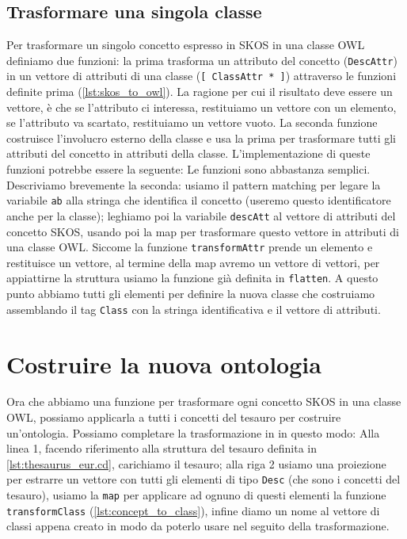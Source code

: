 \subsection{Trasformare una singola classe}
Per trasformare un singolo concetto espresso in SKOS in una classe OWL definiamo due funzioni: la prima trasforma un attributo del concetto (\verb|DescAttr|) in un vettore di attributi di una classe (\verb|[ ClassAttr * ]|) attraverso le funzioni definite prima (\ref{lst:skos_to_owl}). La ragione per cui il risultato deve essere un vettore, è che se l'attributo ci interessa, restituiamo un vettore con un elemento, se l'attributo va scartato, restituiamo un vettore vuoto. La seconda funzione costruisce l'involucro esterno della classe e usa la prima per trasformare tutti gli attributi del concetto in attributi della classe. L'implementazione di queste funzioni potrebbe essere la seguente:
Le funzioni sono abbastanza semplici. Descriviamo brevemente la seconda: usiamo il pattern matching per legare la variabile \verb|ab| alla stringa che identifica il concetto (useremo questo identificatore anche per la classe); leghiamo poi la variabile \verb|descAtt| al vettore di attributi del concetto SKOS, usando poi la map per trasformare questo vettore in attributi di una classe OWL. Siccome la funzione \verb|transformAttr| prende un elemento e restituisce un vettore, al termine della map avremo un vettore di vettori, per appiattirne la struttura usiamo la funzione già definita in \cduce \verb|flatten|. A questo punto abbiamo tutti gli elementi per definire la nuova classe che costruiamo assemblando il tag \verb|Class| con la stringa identificativa e il vettore di attributi.
\section{Costruire la nuova ontologia}
Ora che abbiamo una funzione per trasformare ogni concetto SKOS in una classe OWL, possiamo applicarla a tutti i concetti del tesauro per costruire un'ontologia. Possiamo completare la trasformazione in \cduce in questo modo:
Alla linea 1, facendo riferimento alla struttura del tesauro definita in \ref{lst:thesaurus_eur.cd}, carichiamo il tesauro; alla riga 2 usiamo una proiezione per estrarre un vettore con tutti gli elementi di tipo \verb|Desc| (che sono i concetti del tesauro), usiamo la \verb|map| per applicare ad ognuno di questi elementi la funzione \verb|transformClass| (\ref{lst:concept_to_class}), infine diamo un nome al vettore di classi appena creato in modo da poterlo usare nel seguito della trasformazione.


